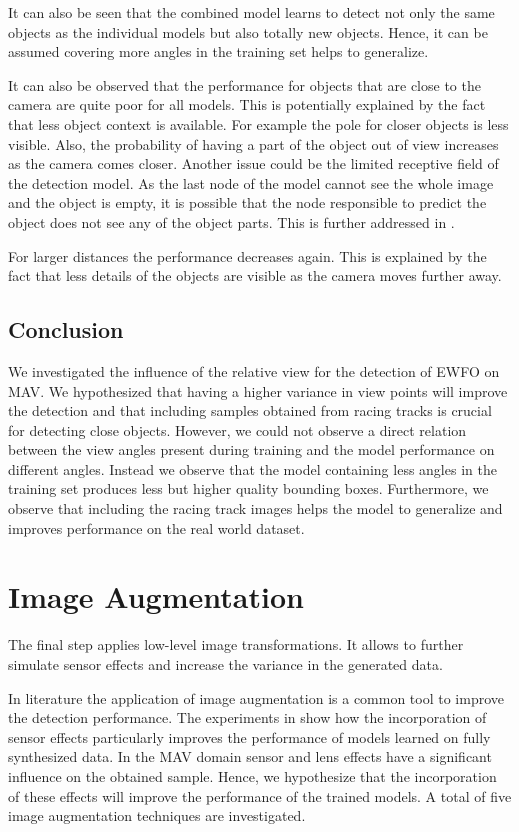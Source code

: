 It can also be seen that the combined model learns to detect not only the same objects as the individual models but also totally new objects. Hence, it can be assumed covering more angles in the training set helps to generalize. 

It can also be observed that the performance for objects that are close to the camera are quite poor for all models. This is potentially explained by the fact that less object context is available. For example the pole for closer objects is less visible. Also, the probability of having a part of the object out of view increases as the camera comes closer. Another issue could be the limited receptive field of the detection model. As the last node of the model cannot see the whole image and the object is empty, it is possible that the node responsible to predict the object does not see any of the object parts. This is further addressed in .

For larger distances the performance decreases again. This is explained by the fact that less details of the objects are visible as the camera moves further away.

\subsection{Conclusion}

We investigated the influence of the relative view for the detection of \ac{EWFO} on \ac{MAV}. We hypothesized that having a higher variance in view points will improve the detection and that including samples obtained from racing tracks is crucial for detecting close objects. However, we could not observe a direct relation between the view angles present during training and the model performance on different angles. Instead we observe that the model containing less angles in the training set produces less but higher quality bounding boxes. Furthermore, we observe that including the racing track images helps the model to generalize and improves performance on the real world dataset.

\section{Image Augmentation}

The final step applies low-level image transformations. It allows to further simulate sensor effects and increase the variance in the generated data.

In literature \cite{Krizhevsky2012a,Howard2013,Redmon,Liu} the application of image augmentation is a common tool to improve the detection performance. The experiments in \cite{Carlson2018} show how the incorporation of sensor effects particularly improves the performance of models learned on fully synthesized data. In the \ac{MAV} domain sensor and lens effects have a significant influence on the obtained sample. Hence, we hypothesize that the incorporation of these effects will improve the performance of the trained models. A total of  five image augmentation techniques are investigated.

